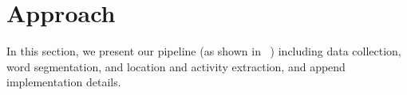 \section{Approach}
\label{sec:approach}


In this section, we present our pipeline (as shown in ~) including data collection, word segmentation, and location and activity extraction, and append implementation details. 

